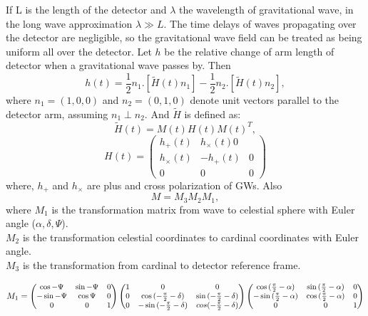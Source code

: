\documentclass{ttuthes2007}
\begin{document}
If L is the length of the detector and $\lambda$ the wavelength of gravitational
wave, in the long wave approximation $\lambda \gg L$. The time delays of
waves propagating over the detector are negligible, so the
gravitational wave field can be treated as being uniform all over the detector.
Let $h$ be the relative change of arm length of detector when a gravitational wave
passes by. Then
\begin{equation}
h(t) = \frac{1}{2} n_1.[\tilde{H}(t)n_1] - \frac{1}{2} n_2. [\tilde{H}(t)n_2],
\end{equation}
where $n_1=(1,0,0)$ and $n_2=(0,1,0)$ denote unit vectors parallel to the
detector arm, assuming $n_1 \perp n_2$. And $\tilde{H}$ is defined as:
\begin{equation}
\tilde{H}(t) = M(t)H(t)M(t)^T,
\end{equation}
\begin{equation*}
H(t)=
\begin{pmatrix}
h_+(t) & h_\times(t) 0\\
h_\times(t) & -h_+(t) & 0\\
0 & 0 & 0
\end{pmatrix}
\end{equation*}
where, $h_+$ and $h_\times$ are plus and cross polarization of \acp{GW}. Also
\begin{equation}
M= M_3 M_2 M_1,
\end{equation}
where
$M_1$ is the transformation matrix from wave to celestial sphere with
Euler angle ($\alpha,\delta,\Psi$).\\
$M_2$ is the transformation celestial coordinates to cardinal coordinates with Euler
angle.\\
$M_3$ is the transformation from cardinal to detector reference frame.

\begin{equation}
\small
M_1=
\begin{pmatrix}
\cos{-\Psi} & \sin{-\Psi}& 0\\
-\sin{-\Psi} & \cos{\Psi}& 0\\
0 & 0 & 1
\end{pmatrix}
\begin{pmatrix}
1 & 0 & 0\\
0 & \cos{(-\frac{\pi}{2}-\delta)} & \sin{(-\frac{\pi}{2}-\delta)}\\
0 & -\sin{(-\frac{\pi}{2}-\delta)} & cos{(-\frac{\pi}{2}-\delta)}
\end{pmatrix}
\begin{pmatrix}
\cos{(\frac{\pi}{2}-\alpha)} & \sin{(\frac{\pi}{2}-\alpha)} & 0\\
-\sin{(\frac{\pi}{2}-\alpha)} & \cos{(\frac{\pi}{2}-\alpha)} & 0\\
0 & 0 & 1 
\end{pmatrix}
\end{equation}
\end{document}
